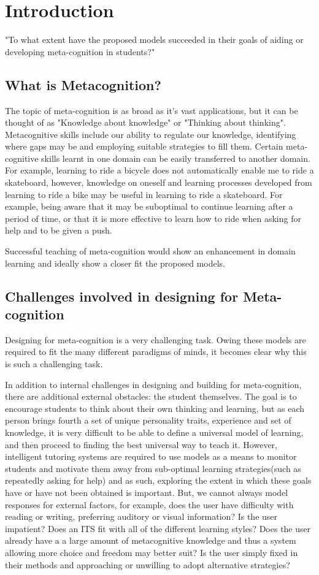 \documentclass[11pt]{article}
\begin{document}
\section{Introduction}
"To what extent have the proposed models succeeded in their goals of aiding or developing meta-cognition in students?"

\subsection{What is Metacognition?}
The topic of meta-cognition is as broad as it's vast applications, but it can be thought of as "Knowledge about knowledge" or "Thinking about thinking". Metacognitive skills include our ability to regulate our knowledge, identifying where gaps may be and employing suitable strategies to fill them. Certain meta-cognitive skills learnt in one domain can be easily transferred to another domain. For example, learning to ride a bicycle does not automatically enable me to ride a skateboard, however, knowledge on oneself and learning processes developed from learning to ride a bike may be useful in learning to ride a skateboard. For example, being aware that it may be suboptimal to continue learning after a period of time, or that it is more effective to learn how to ride when asking for help and to be given a push. 

Successful teaching of meta-cognition would show an enhancement in domain learning and ideally show a closer fit the proposed models. 

\subsection{Challenges involved in designing for Meta-cognition}
Designing for meta-cognition is a very challenging task. Owing these models are required to fit the many different paradigms of minds, it becomes clear why this is such a challenging task. 

In addition to internal challenges in designing and building for meta-cognition, there are additional external obstacles: the student themselves. The goal is to encourage students to think about their own thinking and learning, but as each person brings fourth a set of unique personality traits, experience and set of knowledge, it is very difficult to be able to define a universal model of learning, and then proceed to finding the best universal way to teach it. However, intelligent tutoring systems are required to use models as a means to monitor students and motivate them away from sub-optimal learning strategies(such as repeatedly asking for help) and as such, exploring the extent in which these goals have or have not been obtained is important. But, we cannot always model responses for external factors, for example, does the user have difficulty with reading or writing, preferring auditory or visual information? Is the user impatient? Does an ITS fit with all of the different learning styles? Does the user already have a a large amount of metacognitive knowledge and thus a system allowing more choice and freedom may better suit? Is the user simply fixed in their methods and approaching or unwilling to adopt alternative strategies?
\end{document}
